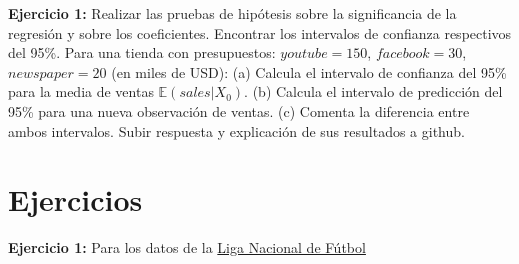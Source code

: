 \documentclass[
]{book}
\begin{document}
\textbf{Ejercicio 1:} Realizar las pruebas de hipótesis sobre la significancia de la regresión y sobre los coeficientes. Encontrar los intervalos de confianza respectivos del 95\%.
Para una tienda con presupuestos:
\(youtube = 150\), \(facebook = 30\), \(newspaper=20\) (en miles de USD):
(a) Calcula el intervalo de confianza del 95\% para la media de ventas \(\mathbb{E}(sales | X_0)\).
(b) Calcula el intervalo de predicción del 95\% para una nueva observación de ventas.
(c) Comenta la diferencia entre ambos intervalos.
Subir respuesta y explicación de sus resultados a github.

\section{Ejercicios}\label{ejercicios-1}

\textbf{Ejercicio 1:} Para los datos de la \href{https://github.com/HaydeePeruyero/MultivariateStatisticalAnalysis/tree/main/data/Liga_nacional_de_futbol.csv}{Liga Nacional de Fútbol}
\end{document}
